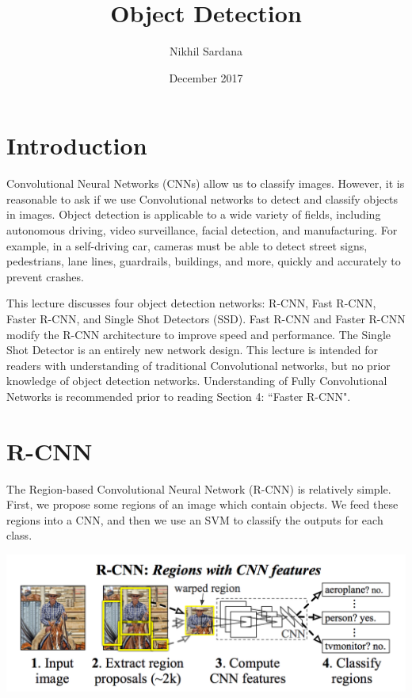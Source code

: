 \documentclass{article}
\title{Object Detection}
\author{Nikhil Sardana}
\date{December 2017}
\begin{document}
\maketitle

\section{Introduction}
Convolutional Neural Networks (CNNs) allow us to classify images. However, it is reasonable to ask if we use Convolutional networks to detect and classify objects in images. Object detection is applicable to a wide variety of fields, including autonomous driving, video surveillance, facial detection, and manufacturing. For example, in a self-driving car, cameras must be able to detect street signs, pedestrians, lane lines, guardrails, buildings, and more, quickly and accurately to prevent crashes.

This lecture discusses four object detection networks: R-CNN, Fast R-CNN, Faster R-CNN, and Single Shot Detectors (SSD). Fast R-CNN and Faster R-CNN modify the R-CNN architecture to improve speed and performance. The Single Shot Detector is an entirely new network design. This lecture is intended for readers with understanding of traditional Convolutional networks, but no prior knowledge of object detection networks. Understanding of Fully Convolutional Networks is recommended prior to reading Section 4: ``Faster R-CNN".

\section{R-CNN}
The Region-based Convolutional Neural Network (R-CNN) is relatively simple. First, we propose some regions of an image which contain objects. We feed these regions into a CNN, and then we use an SVM to classify the outputs for each class.

\begin{center}
\includegraphics[scale=0.3]{rcnn.png}
\end{center}
\end{document}
